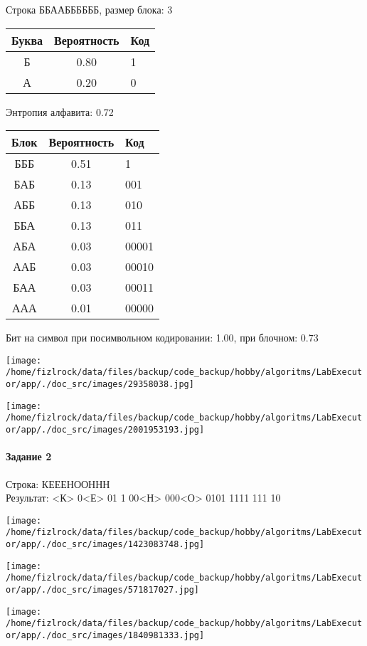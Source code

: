 \documentclass[a4paper, 12pt]{article}
\begin{document}
Строка ББААББББББ, размер блока: 3
\begin{center}
 \begin{tabular}{ |c|c|l| } 
  \hline
     Буква & Вероятность & Код\\ \hline
Б & 0.80 & 1\\\hline
А & 0.20 & 0
\\ \hline \end{tabular}
\end{center}
Энтропия алфавита: 0.72
\begin{center}
 \begin{tabular}{ |c|c|l| } 
  \hline
     Блок & Вероятность & Код\\ \hline
БББ & 0.51 & 1\\\hline
БАБ & 0.13 & 001\\\hline
АББ & 0.13 & 010\\\hline
ББА & 0.13 & 011\\\hline
АБА & 0.03 & 00001\\\hline
ААБ & 0.03 & 00010\\\hline
БАА & 0.03 & 00011\\\hline
ААА & 0.01 & 00000
\\ \hline \end{tabular}
\end{center}
Бит на символ при посимвольном кодировании: 1.00, при блочном: 0.73

\texttt{[image: /home/fizlrock/data/files/backup/code\_backup/hobby/algoritms/LabExecutor/app/./doc\_src/images/29358038.jpg]}

\texttt{[image: /home/fizlrock/data/files/backup/code\_backup/hobby/algoritms/LabExecutor/app/./doc\_src/images/2001953193.jpg]}
\pagebreak
\paragraph{Задание 2}

Строка: 
КЕЕЕНООННН\\
Результат: <К> 0<Е> 01 1 00<Н> 000<О> 0101 1111 111 10

\texttt{[image: /home/fizlrock/data/files/backup/code\_backup/hobby/algoritms/LabExecutor/app/./doc\_src/images/1423083748.jpg]}

\texttt{[image: /home/fizlrock/data/files/backup/code\_backup/hobby/algoritms/LabExecutor/app/./doc\_src/images/571817027.jpg]}

\texttt{[image: /home/fizlrock/data/files/backup/code\_backup/hobby/algoritms/LabExecutor/app/./doc\_src/images/1840981333.jpg]}
\end{document}
